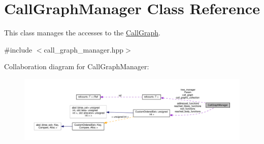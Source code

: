 \hypertarget{classCallGraphManager}{}\section{Call\+Graph\+Manager Class Reference}
\label{classCallGraphManager}


This class manages the accesses to the \hyperlink{classCallGraph}{Call\+Graph}.  




{\ttfamily \#include $<$call\+\_\+graph\+\_\+manager.\+hpp$>$}



Collaboration diagram for Call\+Graph\+Manager\+:
\nopagebreak
\begin{figure}[H]
\begin{center}
\leavevmode
\includegraphics[width=350pt]{d6/d63/classCallGraphManager__coll__graph}
\end{center}
\end{figure}

